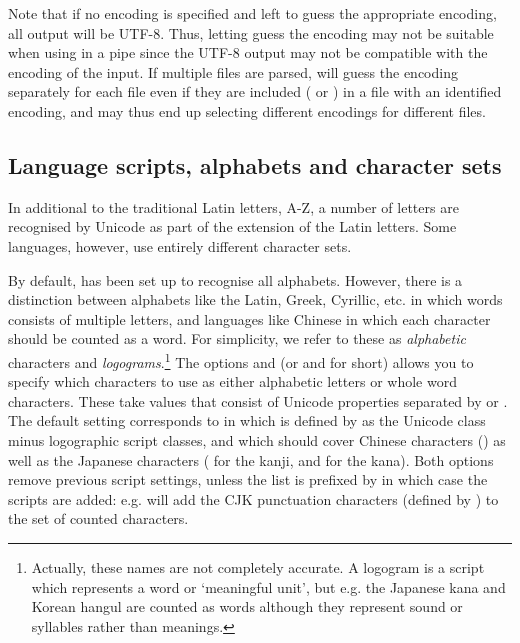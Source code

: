 \documentclass{article}
\begin{document}
Note that if no encoding is specified and \TeXcount{} left to guess the appropriate encoding, all output will be UTF-8. Thus, letting \TeXcount{} guess the encoding may not be suitable when using \TeXcount{} in a pipe since the UTF-8 output may not be compatible with the encoding of the input. If multiple files are parsed, \TeXcount{} will guess the encoding separately for each file even if they are included ( or ) in a file with an identified encoding, and may thus end up selecting different encodings for different files.


\subsection{Language scripts, alphabets and character sets}

In additional to the traditional Latin letters, A-Z, a number of letters are recognised by Unicode as part of the extension of the Latin letters. Some languages, however, use entirely different character sets.

By default, \TeXcount{} has been set up to recognise all alphabets. However, there is a distinction between alphabets like the Latin, Greek, Cyrillic, etc. in which words consists of multiple letters, and languages like Chinese in which each character should be counted as a word. For simplicity, we refer to these as \emph{alphabetic} characters and \emph{logograms}.\footnote{%
Actually, these names are not completely accurate. A logogram is a script which represents a word or `meaningful unit', but e.g. the Japanese kana and Korean hangul are counted as words although they represent sound or syllables rather than meanings.}
The options  and  (or  and  for short) allows you to specify which characters to use as either alphabetic letters or whole word characters. These take values that consist of Unicode properties separated by \code{,} or \code{+}. The default setting corresponds to
in which  is defined by \TeXcount{} as the Unicode  class minus logographic script classes, and
which should cover Chinese characters () as well as the Japanese characters ( for the kanji,  and  for the kana). Both options remove previous script settings, unless the list is prefixed by \code{+} in which case the scripts are added: e.g.  will add the CJK punctuation characters (defined by \TeXcount) to the set of counted characters.
\end{document}
